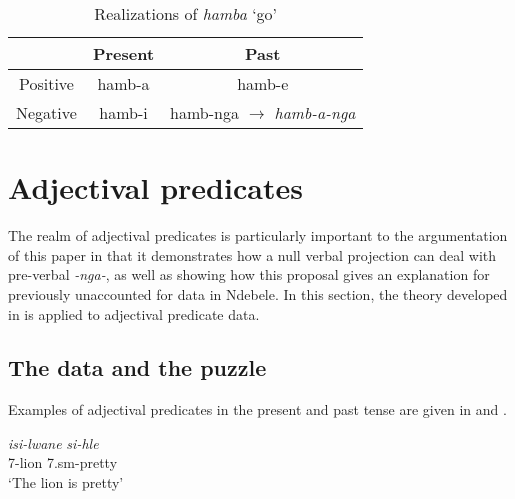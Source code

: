 \documentclass[output=paper]{langsci/langscibook}
\begin{document}
{\begin{table}
\caption{Realizations of \textit{hamba} `go'} %
\centering %
\begin{tabular}{|c|c|c|} %
\hline%
 & Present & Past\\ [0.5ex] 
\midrule%
Positive & hamb-a  & hamb-e  \\ %
Negative & hamb-i & hamb-nga $\longrightarrow$ \textit{hamb-a-nga}\\[1ex] %
\midrule%
\end{tabular} 
\label{tab:hresult} 
\end{table} 





\section{Adjectival predicates}

The realm of adjectival predicates is particularly important to the argumentation of this paper in that it demonstrates how a null verbal projection can deal with pre-verbal \textit{-nga-}, as well as showing how this proposal gives an explanation for previously unaccounted for data in Ndebele. In this section, the theory developed in  is applied to adjectival predicate data.

\subsection{The data and the puzzle}

Examples of adjectival predicates in the present and past tense are given in  and .

\begin{exe}
\ex \begin{xlist}
\ex \gll \textit{isi-lwane} \textit{si-hle}\\
       7-lion 7.{\sc sm}-pretty\\
    \glt `The lion is pretty' 


\end{xlist}
\end{exe}}
\end{document}
